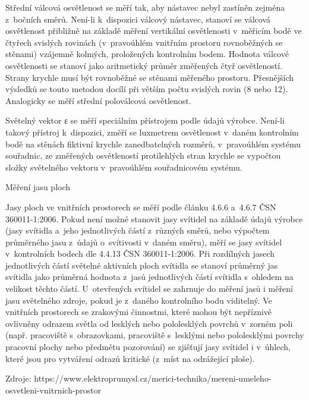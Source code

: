 \medskip
Střední válcová osvětlenost se měří tak, aby nástavec nebyl zastíněn zejména z~bočních směrů.
Není-li k~dispozici válcový nástavec, stanoví se válcová osvětlenost přibližně na základě měření
vertikální osvětlenosti v~měřicím bodě ve čtyřech svislých rovinách (v~pravoúhlém vnitřním prostoru
rovnoběžných se stěnami) vzájemně kolmých, proložených kontrolním bodem. Hodnota válcové osvětlenosti
se stanoví jako aritmetický průměr změřených čtyř osvětleností. Strany krychle musí být rovnoběžné
se stěnami měřeného prostoru. Přesnějších výsledků se touto metodou docílí při větším počtu svislých
rovin (8 nebo 12). Analogicky se měří střední poloválcová osvětlenost.

\medskip
Světelný vektor ε se měří speciálním přístrojem podle údajů výrobce. Není-li takový přístroj k~dispozici,
změří se luxmetrem osvětlenost v~daném kontrolním bodě na stěnách fiktivní krychle zanedbatelných rozměrů,
v~pravoúhlém systému souřadnic, ze změřených osvětleností protilehlých stran krychle se vypočtou složky
světelného vektoru v~pravoúhlém souřadnicovém systému.

\sec Měření jasu ploch

Jasy ploch ve vnitřních prostorech se měří podle článku 4.6.6 a~4.6.7 ČSN 360011-1:2006. Pokud není
možné stanovit jasy svítidel na základě údajů výrobce (jasy svítidla a~jeho jednotlivých částí z~různých
směrů, nebo výpočtem průměrného jasu z~údajů o~svítivosti v~daném směru), měří se jasy svítidel v~kontrolních
bodech dle 4.4.13 ČSN 360011-1:2006.
\medskip
Při rozdílných jasech jednotlivých částí světelné aktivních ploch svítidla se stanoví průměrný jas
svítidla jako průměrná hodnota z~jasů jednotlivých částí svítidla s~ohledem na velikost těchto částí.
U~otevřených svítidel se zahrnuje do měření jasů i měření jasu světelného zdroje, pokud je z~daného
kontrolního bodu viditelný.
\medskip
Ve vnitřních prostorech se zrakovými činnostmi, které mohou být nepříznivě ovlivněny odrazem světla
od lesklých nebo pololesklých povrchů v~zorném poli (např. pracoviště s~obrazovkami, pracoviště s~lesklými
nebo pololesklými povrchy pracovní plochy nebo předmětu pozorování) se zjišťují jasy svítidel i v~úhlech,
které jsou pro vytváření odrazů kritické (z~míst na odrážející ploše).

\medskip
Zdroje: https://www.elektroprumysl.cz/merici-technika/mereni-umeleho-osvetleni-vnitrnich-prostor